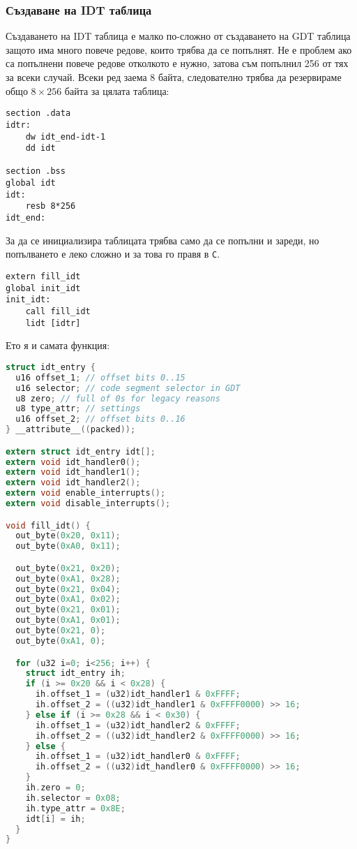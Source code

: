 \subsubsection{Създаване на IDT таблица}
Създаването на IDT таблица е малко по-сложно от създаването на GDT таблица защото има много повече редове, които трябва да се попълнят. Не е проблем ако са попълнени повече редове отколкото е нужно, затова съм попълнил 256 от тях за всеки случай. Всеки ред заема 8 байта, следователно трябва да резервираме общо $8\times 256$ байта за цялата таблица:
\begin{lstlisting}
section .data
idtr:
    dw idt_end-idt-1
    dd idt

section .bss
global idt
idt:
    resb 8*256
idt_end:
\end{lstlisting}
За да се инициализира таблицата трябва само да се попълни и зареди, но попълването е леко сложно и за това го правя в {\tt C}.
\begin{lstlisting}
extern fill_idt
global init_idt
init_idt:
    call fill_idt
    lidt [idtr]
\end{lstlisting}
Ето я и самата функция:
\begin{lstlisting}[language=C]
struct idt_entry {
  u16 offset_1; // offset bits 0..15
  u16 selector; // code segment selector in GDT
  u8 zero; // full of 0s for legacy reasons
  u8 type_attr; // settings
  u16 offset_2; // offset bits 0..16
} __attribute__((packed));

extern struct idt_entry idt[];
extern void idt_handler0();
extern void idt_handler1();
extern void idt_handler2();
extern void enable_interrupts();
extern void disable_interrupts();

void fill_idt() {
  out_byte(0x20, 0x11);
  out_byte(0xA0, 0x11);

  out_byte(0x21, 0x20);
  out_byte(0xA1, 0x28);
  out_byte(0x21, 0x04);
  out_byte(0xA1, 0x02);
  out_byte(0x21, 0x01);
  out_byte(0xA1, 0x01);
  out_byte(0x21, 0);
  out_byte(0xA1, 0);

  for (u32 i=0; i<256; i++) {
    struct idt_entry ih;
    if (i >= 0x20 && i < 0x28) {
      ih.offset_1 = (u32)idt_handler1 & 0xFFFF;
      ih.offset_2 = ((u32)idt_handler1 & 0xFFFF0000) >> 16;
    } else if (i >= 0x28 && i < 0x30) {
      ih.offset_1 = (u32)idt_handler2 & 0xFFFF;
      ih.offset_2 = ((u32)idt_handler2 & 0xFFFF0000) >> 16;
    } else {
      ih.offset_1 = (u32)idt_handler0 & 0xFFFF;
      ih.offset_2 = ((u32)idt_handler0 & 0xFFFF0000) >> 16;
    }
    ih.zero = 0;
    ih.selector = 0x08;
    ih.type_attr = 0x8E;
    idt[i] = ih;
  }
}
\end{lstlisting}
